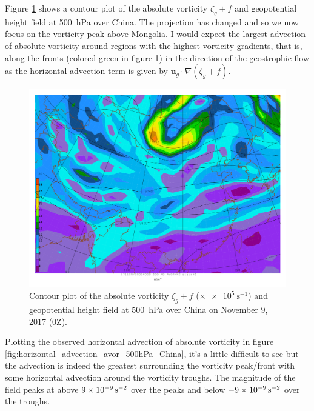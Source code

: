 \documentclass[11pt]{article}
\begin{document}
Figure \ref{fig:avorwnd_500hPa_China} shows a contour plot of the absolute vorticity $\zeta_g + f$ and geopotential height field at \SI{500}{\hecto\Pa} over China. The projection has changed and so we now focus on the vorticity peak above Mongolia. I would expect the largest advection of absolute vorticity around regions with the highest vorticity gradients, that is, along the fronts (colored green in figure \ref{fig:avorwnd_500hPa_China}) in the direction of the geostrophic flow as the horizontal advection term is given by $\bm{u}_g \cdot \nabla (\zeta_g + f)$.

\begin{figure}[h!]
	\centering
	\includegraphics[width=\textwidth]{avorwnd_500hPa_China}
	\caption{Contour plot of the absolute vorticity $\zeta_g + f$ ($\times \SI{e5}{\s^{-1}}$) and geopotential height field at \SI{500}{\hecto\Pa} over China on November 9, 2017 (0Z).}
	\label{fig:avorwnd_500hPa_China}
\end{figure}

Plotting the observed horizontal advection of absolute vorticity in figure \ref{fig:horizontal_advection_avor_500hPa_China}, it's a little difficult to see but the advection is indeed the greatest surrounding the vorticity peak/front with some horizontal advection around the vorticity troughs. The magnitude of the field peaks at above $\SI{9d-9}{\s^{-2}}$ over the peaks and below $\SI{-9d-9}{\s^{-2}}$ over the troughs.
\end{document}
